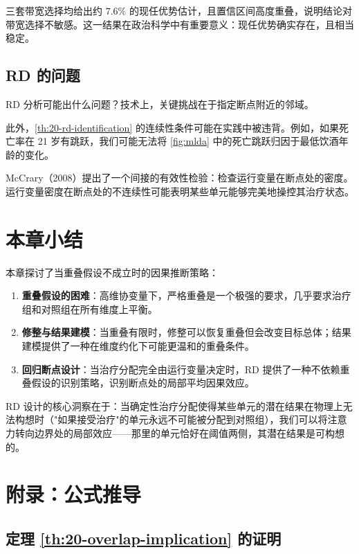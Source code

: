三套带宽选择均给出约 $7.6\%$ 的现任优势估计，且置信区间高度重叠，说明结论对带宽选择不敏感。这一结果在政治科学中有重要意义：现任优势确实存在，且相当稳定。

\subsection{RD 的问题}\label{sec:20-rd-problems}

RD 分析可能出什么问题？技术上，关键挑战在于指定断点附近的邻域。

此外，\cref{th:20-rd-identification} 的连续性条件可能在实践中被违背。例如，如果死亡率在 21 岁有跳跃，我们可能无法将 \cref{fig:mlda} 中的死亡跳跃归因于最低饮酒年龄的变化。

McCrary（2008）提出了一个间接的有效性检验：检查运行变量在断点处的密度。运行变量密度在断点处的不连续性可能表明某些单元能够完美地操控其治疗状态。

\section{本章小结}\label{sec:20-summary}

本章探讨了当重叠假设不成立时的因果推断策略：

\begin{enumerate}
  \item \textbf{重叠假设的困难}：高维协变量下，严格重叠是一个极强的要求，几乎要求治疗组和对照组在所有维度上平衡。
  \item \textbf{修整与结果建模}：当重叠有限时，修整可以恢复重叠但会改变目标总体；结果建模提供了一种在维度约化下可能更温和的重叠条件。
  \item \textbf{回归断点设计}：当治疗分配完全由运行变量决定时，RD 提供了一种不依赖重叠假设的识别策略，识别断点处的局部平均因果效应。
\end{enumerate}

RD 设计的核心洞察在于：当确定性治疗分配使得某些单元的潜在结果在物理上无法构想时（"如果接受治疗"的单元永远不可能被分配到对照组），我们可以将注意力转向边界处的局部效应——那里的单元恰好在阈值两侧，其潜在结果是可构想的。

\section*{附录：公式推导}\label{sec:appendix-20}

\subsection{定理 \cref{th:20-overlap-implication} 的证明}\label{sec:appendix-20-overlap-proof}

